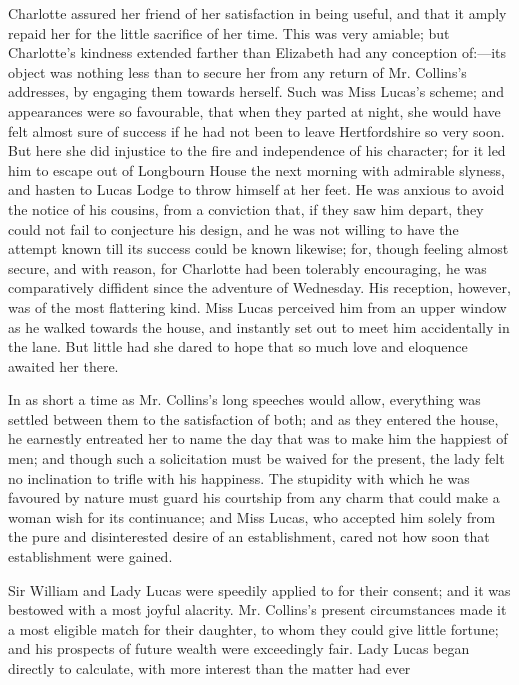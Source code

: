 \documentclass[12pt,openright]{book}
\begin{document}
Charlotte assured her friend of her satisfaction in being useful, and that it amply repaid her for the little sacrifice of her time. This was very amiable; but Charlotte’s kindness extended farther than Elizabeth had any conception of:—its object was nothing less than to secure her from any return of Mr. Collins’s addresses, by engaging them towards herself. Such was Miss Lucas’s scheme; and appearances were so favourable, that when they parted at night, she would have felt almost sure of success if he had not been to leave Hertfordshire so very soon. But here she did injustice to the fire and independence of his character; for it led him to escape out of Longbourn House the next morning with admirable slyness, and hasten to Lucas Lodge to throw himself at her feet. He was anxious to avoid the notice of his cousins, from a conviction that, if they saw him depart, they could not fail to conjecture his design, and he was not willing to have the attempt known till its success could be known likewise; for, though feeling almost secure, and with reason, for Charlotte had been tolerably encouraging, he was comparatively diffident since the adventure of Wednesday. His reception, however, was of the most flattering kind. Miss Lucas perceived him from an upper window as he walked towards the house, and instantly set out to meet him accidentally in the lane. But little had she dared to hope that so much love and eloquence awaited her there.

In as short a time as Mr. Collins’s long speeches would allow, everything was settled between them to the satisfaction of both; and as they entered the house, he earnestly entreated her to name the day that was to make him the happiest of men; and though such a solicitation must be waived for the present, the lady felt no inclination to trifle with his happiness. The stupidity with which he was favoured by nature must guard his courtship from any charm that could make a woman wish for its continuance; and Miss Lucas, who accepted him solely from the pure and disinterested desire of an establishment, cared not how soon that establishment were gained.

Sir William and Lady Lucas were speedily applied to for their consent; and it was bestowed with a most joyful alacrity. Mr. Collins’s present circumstances made it a most eligible match for their daughter, to whom they could give little fortune; and his prospects of future wealth were exceedingly fair. Lady Lucas began directly to calculate, with more interest than the matter had ever
\end{document}
